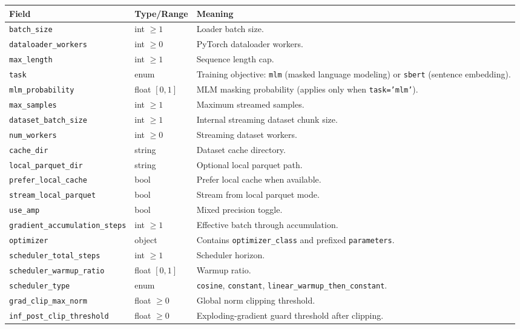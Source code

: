 \small
\begin{longtable}{p{5.1cm}p{2.4cm}p{7.0cm}}
\toprule
\textbf{Field} & \textbf{Type/Range} & \textbf{Meaning} \\
\midrule
\endhead
\texttt{batch\_size} & int $\ge 1$ & Loader batch size. \\
\texttt{dataloader\_workers} & int $\ge 0$ & PyTorch dataloader workers. \\
\texttt{max\_length} & int $\ge 1$ & Sequence length cap. \\
\texttt{task} & enum & Training objective: \texttt{mlm} (masked language modeling) or \texttt{sbert} (sentence embedding). \\
\texttt{mlm\_probability} & float $[0,1]$ & MLM masking probability (applies only when \texttt{task='mlm'}). \\
\texttt{max\_samples} & int $\ge 1$ & Maximum streamed samples. \\
\texttt{dataset\_batch\_size} & int $\ge 1$ & Internal streaming dataset chunk size. \\
\texttt{num\_workers} & int $\ge 0$ & Streaming dataset workers. \\
\texttt{cache\_dir} & string & Dataset cache directory. \\
\texttt{local\_parquet\_dir} & string & Optional local parquet path. \\
\texttt{prefer\_local\_cache} & bool & Prefer local cache when available. \\
\texttt{stream\_local\_parquet} & bool & Stream from local parquet mode. \\
\texttt{use\_amp} & bool & Mixed precision toggle. \\
\texttt{gradient\_accumulation\_steps} & int $\ge 1$ & Effective batch through accumulation. \\
\texttt{optimizer} & object & Contains \texttt{optimizer\_class} and prefixed \texttt{parameters}. \\
\texttt{scheduler\_total\_steps} & int $\ge 1$ & Scheduler horizon. \\
\texttt{scheduler\_warmup\_ratio} & float $[0,1]$ & Warmup ratio. \\
\texttt{scheduler\_type} & enum & \texttt{cosine}, \texttt{constant}, \texttt{linear\_warmup\_then\_constant}. \\
\texttt{grad\_clip\_max\_norm} & float $\ge 0$ & Global norm clipping threshold. \\
\texttt{inf\_post\_clip\_threshold} & float $\ge 0$ & Exploding-gradient guard threshold after clipping. \\

\end{longtable}
